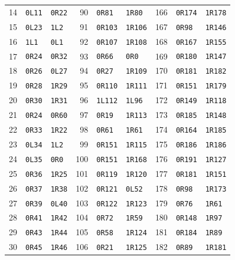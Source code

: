 \begin{longtable}{rll@{\hspace{8mm}}rll@{\hspace{8mm}}rll}
14 & \texttt{0L11} & \texttt{0R22} & 90 & \texttt{0R81} & \texttt{1R80} & 166 & \texttt{0R174} & \texttt{1R178} \\
15 & \texttt{0L23} & \texttt{1L2} & 91 & \texttt{0R103} & \texttt{1R106} & 167 & \texttt{0R98} & \texttt{1R146} \\
16 & \texttt{1L1} & \texttt{0L1} & 92 & \texttt{0R107} & \texttt{1R108} & 168 & \texttt{0R167} & \texttt{1R155} \\
17 & \texttt{0R24} & \texttt{0R32} & 93 & \texttt{0R66} & \texttt{0R0} & 169 & \texttt{0R180} & \texttt{1R147} \\
18 & \texttt{0R26} & \texttt{0L27} & 94 & \texttt{0R27} & \texttt{1R109} & 170 & \texttt{0R181} & \texttt{1R182} \\
19 & \texttt{0R28} & \texttt{1R29} & 95 & \texttt{0R110} & \texttt{1R111} & 171 & \texttt{0R151} & \texttt{1R179} \\
20 & \texttt{0R30} & \texttt{1R31} & 96 & \texttt{1L112} & \texttt{1L96} & 172 & \texttt{0R149} & \texttt{1R118} \\
21 & \texttt{0R24} & \texttt{0R60} & 97 & \texttt{0R19} & \texttt{1R113} & 173 & \texttt{0R185} & \texttt{1R148} \\
22 & \texttt{0R33} & \texttt{1R22} & 98 & \texttt{0R61} & \texttt{1R61} & 174 & \texttt{0R164} & \texttt{1R185} \\
23 & \texttt{0L34} & \texttt{1L2} & 99 & \texttt{0R151} & \texttt{1R115} & 175 & \texttt{0R186} & \texttt{1R186} \\
24 & \texttt{0L35} & \texttt{0R0} & 100 & \texttt{0R151} & \texttt{1R168} & 176 & \texttt{0R191} & \texttt{1R127} \\
25 & \texttt{0R36} & \texttt{1R25} & 101 & \texttt{0R119} & \texttt{1R120} & 177 & \texttt{0R181} & \texttt{1R151} \\
26 & \texttt{0R37} & \texttt{1R38} & 102 & \texttt{0R121} & \texttt{0L52} & 178 & \texttt{0R98} & \texttt{1R173} \\
27 & \texttt{0R39} & \texttt{0L40} & 103 & \texttt{0R122} & \texttt{1R123} & 179 & \texttt{0R76} & \texttt{1R61} \\
28 & \texttt{0R41} & \texttt{1R42} & 104 & \texttt{0R72} & \texttt{1R59} & 180 & \texttt{0R148} & \texttt{1R97} \\
29 & \texttt{0R43} & \texttt{1R44} & 105 & \texttt{0R58} & \texttt{1R124} & 181 & \texttt{0R184} & \texttt{1R89} \\
30 & \texttt{0R45} & \texttt{1R46} & 106 & \texttt{0R21} & \texttt{1R125} & 182 & \texttt{0R89} & \texttt{1R181} \\

\end{longtable}
